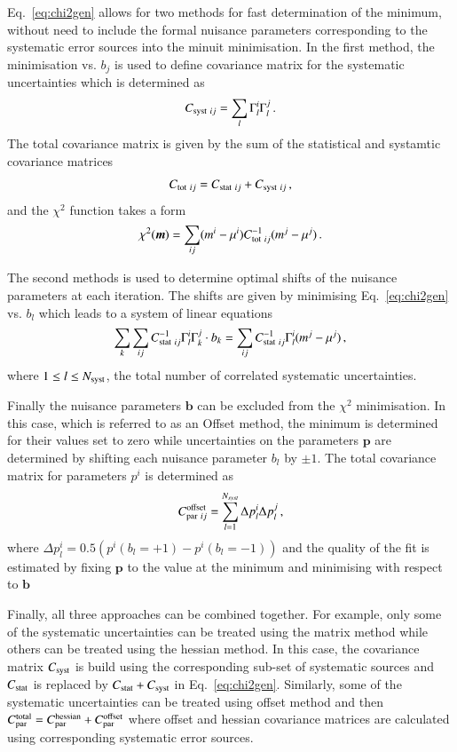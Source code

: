 \begin{description}
Eq.~\ref{eq:chi2gen} allows for two methods for fast determination
of the minimum, without need to include the formal nuisance parameters
corresponding to the systematic error sources into the minuit minimisation.
In the first method, the minimisation vs. $b_j$ is used to define covariance
matrix for the systematic uncertainties which is determined as
\begin{equation}
 C_{{\rm syst}~ij}= \sum_l \Gamma^i_l \Gamma^j_l \,.
\end{equation}
The total covariance matrix is given by the sum of the statistical and
systamtic covariance matrices
\begin{equation} 
C_{{\rm tot}~ij} = C_{{\rm stat}~ij} + C_{{\rm syst}~ij}\,,
\end{equation}
and the $\chi^2$ function takes a form
\begin{equation}
  \chi^2( \boldsymbol{m}) = \sum_{ij} ( m^i - \mu^i) C^{-1}_{{\rm tot}~ij} 
( m^j - \mu^j)\,.
\end{equation}

The second methods is used to determine optimal shifts of the nuisance
parameters at each iteration. The shifts are given by minimising 
Eq.~\ref{eq:chi2gen} vs. $b_l$ which leads to a system of  linear equations 
\begin{equation}
 \sum_k \sum_{ij} C^{-1}_{{\rm stat}~ij} \Gamma^i_l \Gamma^j_k \cdot b_k = \sum_{ij} C^{-1}_{{\rm stat}~ij} \Gamma^i_l (m^j - \mu^j)\,,
\end{equation}
where $1\le l \le N_{\rm syst}$, the total number of correlated systematic uncertainties.

Finally the nuisance parameters $\boldsymbol{b}$ can be excluded from the $\chi^2$ minimisation.  
In this case, which is referred to as an Offset method, the minimum is determined for their values set to zero
while uncertainties on the parameters $\boldsymbol{p}$ are determined by shifting each nuisance parameter $b_l$
by $\pm 1$. The total covariance matrix for parameters $p^i$ is determined as 
\begin{equation}
  C^{\rm offset}_{ {\rm par}~ ij} = \sum_{l=1}^{N_{syst}} \Delta p^i_l \Delta p^j_l \,,
\end{equation}
where $ \Delta p^i_l = 0.5 ( p^i( b_l = +1 ) - p^i(b_l = -1))$ and the quality of the fit is estimated by 
fixing $\boldsymbol{p}$ to the value at the minimum and minimising with respect to $\boldsymbol{b}$

Finally, all three approaches can be combined together. For example, only some of the systematic uncertainties
can be treated using the matrix method while others can be treated using the hessian method. In this case, the
covariance matrix  $C_{\rm syst}$ is build using the corresponding sub-set of systematic sources and $C_{\rm stat}$ 
is replaced by $C_{\rm stat}+C_{\rm syst}$ in Eq.~\ref{eq:chi2gen}. Similarly, some of the systematic uncertainties
can be treated using offset method and then $C^{\rm total}_{ {\rm par}} = C^{\rm hessian}_{\rm par} + C^{\rm offset}_{\rm par}$
where offset and hessian covariance matrices are calculated using corresponding systematic error sources.


\end{description}
